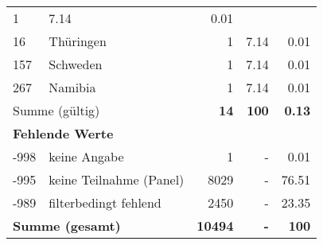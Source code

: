 \begin{longtable}{lXrrr}
       \num{1} &
       \num[round-mode=places,round-precision=2]{7.14} &
         \num[round-mode=places,round-precision=2]{0.01} \\

     16 &
     \multicolumn{1}{X}{ Thüringen   } &


       \num{1} &
       \num[round-mode=places,round-precision=2]{7.14} &
         \num[round-mode=places,round-precision=2]{0.01} \\

     157 &
     \multicolumn{1}{X}{ Schweden   } &


       \num{1} &
       \num[round-mode=places,round-precision=2]{7.14} &
         \num[round-mode=places,round-precision=2]{0.01} \\

     267 &
     \multicolumn{1}{X}{ Namibia   } &


       \num{1} &
       \num[round-mode=places,round-precision=2]{7.14} &
         \num[round-mode=places,round-precision=2]{0.01} \\
     \midrule
     \multicolumn{2}{l}{Summe (gültig)} &
       \textbf{\num{14}} &
     \textbf{\num{100}} &
       \textbf{\num[round-mode=places,round-precision=2]{0.13}} \\
     \multicolumn{5}{l}{\textbf{Fehlende Werte}}\\
       -998 &
       keine Angabe &
         \num{1} &
        - &
         \num[round-mode=places,round-precision=2]{0.01} \\
       -995 &
       keine Teilnahme (Panel) &
         \num{8029} &
        - &
         \num[round-mode=places,round-precision=2]{76.51} \\
       -989 &
       filterbedingt fehlend &
         \num{2450} &
        - &
         \num[round-mode=places,round-precision=2]{23.35} \\
     \midrule
     \multicolumn{2}{l}{\textbf{Summe (gesamt)}} &
          \textbf{\num{10494}} &
        \textbf{-} &
        \textbf{\num{100}} \\
     \bottomrule
     \end{longtable}
     
